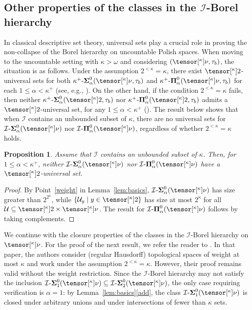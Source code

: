 \documentclass{amsart}
\numberwithin{equation}{section}
\newcommand{\I}{\mathcal{I}}
\newcommand{\U}{\mathcal{U}}
\newcommand{\pre}[2]{\tensor[^{#1}]{#2}{}}
\newcommand{\1}{\mathbf{I}}
\newcommand{\2}{\mathbf{II}}
\newcommand{\Sii}[2]{\k^+\text{-}\boldsymbol{\Sigma}^{ #1 }_{ #2}}
\newcommand{\Pii}[2]{\k^+\text{-}\boldsymbol{\Pi}^{ #1 }_{ #2 }}
\newcommand{\Siid}[2]{\I\text{-}\boldsymbol{\Sigma}^{ #1 }_{ #2}}
\newcommand{\Piid}[2]{\I\text{-}\boldsymbol{\Pi}^{ #1 }_{ #2 }}
\renewcommand{\a}{\alpha}
\renewcommand{\k}{\kappa}
\newtheorem{proposition}[theorem]{Proposition}
\theoremstyle{definition}
\theoremstyle{remark}
\begin{document}
\subsection{Other properties of the classes in the \(\I\)-Borel hierarchy}
In classical descriptive set theory, universal sets play a crucial role in proving the non-collapse of the Borel hierarchy on uncountable Polish spaces. When moving to the uncountable setting with \(\k>\omega\) and considering \((\pre{\k}{\nu}, \tau_b)\), the situation is as follows. Under the assumption \(2^{<\k}=\k\), there exist \(\pre{\k}{2}\)-universal sets for both \(\Sii{0}{\a}(\pre{\k}{\nu}, \tau_b)\) and \(\Pii{0}{\a}(\pre{\k}{\nu}, \tau_b)\) for each \(1\leq\a<\k^+\) (see, e.g., \cite{ACMRP}). 
On the other hand, if the condition \(2^{<\k}=\k\) fails, then neither \(\Sii{0}{\a}(\pre{\k}{2}, \tau_b)\) nor \(\Pii{0}{\a}(\pre{\k}{2}, \tau_b)\) admits a \(\pre{\k}{2}\)-universal set, for any \(1\leq\a<\k^+\) (\cite[Corollary 4.16]{AMR}). 
The result below shows that when \(\I\) contains an unbounded subset of \(\k\), there are no universal sets for \(\Siid{0}{\a}(\pre{\k}{\nu})\) nor \(\Piid{0}{\a}(\pre{\k}{\nu})\), regardless of whether \(2^{<\k}=\k\) holds.

\begin{proposition}
Assume that \(\I\) contains an unbounded subset of \(\k\). Then, for \(1 \leq \a <\k^+\), neither \(\Siid{0}{\a}(\pre{\k}{\nu})\) nor \(\Piid{0}{\a}(\pre{\k}{\nu})\) have a \(\pre{\k}{2}\)-universal set.
\end{proposition}
\begin{proof}
By Point~\ref{weight} in Lemma~\ref{lem:basics}, \(\Siid{0}{\a}(\pre{\k}{\nu})\) has size greater than \(2^{2^\kappa}\), while \(\left\lbrace \U_y \mid y \in \pre{\k}{2}\right\rbrace \) has size at most \( 2^\k\) for all \(\U \subseteq \pre{\k}{2}\times \pre{\k}{\nu}\). The result for \(\Piid{0}{\a}(\pre{\k}{\nu})\) follows by taking complements.
\end{proof}

We continue with the closure properties of the classes in the \(\I\)-Borel hierarchy on \(\pre{\k}{\nu}\). 
For the proof of the next result, we refer the reader to \cite{ACMRP}. In that paper, the authors consider (regular Hausdorff) topological spaces of weight at most \(\k\) and work under the assumption \(2^{<\kappa}=\kappa\). However, their proof remains valid without the weight restriction. 
Since the \(\I\)-Borel hierarchy may not satisfy the inclusion \(\Siid{0}{1}(\pre{\k}{\nu}) \subseteq \Siid{0}{2}(\pre{\k}{\nu})\), the only case requiring verification is \(\a=1\): by Lemma~\ref{lem:basics}\ref{add}, the class \(\Siid{0}{1}(\pre{\k}{\nu})\) is closed under arbitrary unions and under intersections of fewer than \(\k\) sets.
\end{document}

